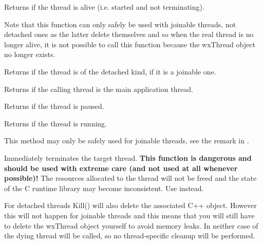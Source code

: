\label{wxthreadisalive}


Returns \true if the thread is alive (i.e. started and not terminating).

Note that this function can only safely be used with joinable threads, not
detached ones as the latter delete themselves and so when the real thread is
no longer alive, it is not possible to call this function because
the wxThread object no longer exists.

\label{wxthreadisdetached}


Returns \true if the thread is of the detached kind, \false if it is a joinable
one.


\label{wxthreadismain}


Returns \true if the calling thread is the main application thread.


\label{wxthreadispaused}


Returns \true if the thread is paused.


\label{wxthreadisrunning}


Returns \true if the thread is running.

This method may only be safely used for joinable threads, see the remark in 
.


\label{wxthreadkill}


Immediately terminates the target thread. {\bf This function is dangerous and should
be used with extreme care (and not used at all whenever possible)!} The resources
allocated to the thread will not be freed and the state of the C runtime library
may become inconsistent. Use  instead.

For detached threads Kill() will also delete the associated C++ object.
However this will not happen for joinable threads and this means that you will
still have to delete the wxThread object yourself to avoid memory leaks.
In neither case  of the dying thread will be
called, so no thread-specific cleanup will be performed.

